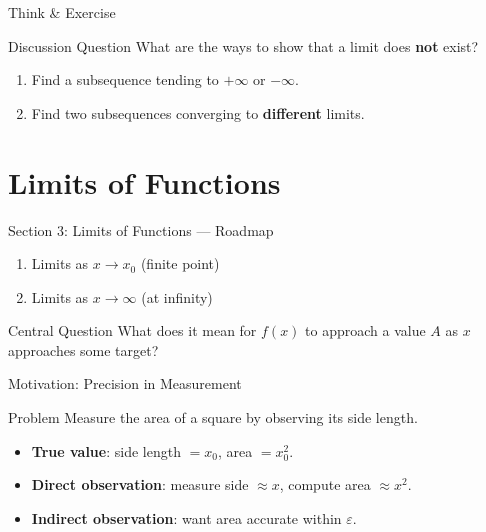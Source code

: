 \documentclass[aspectratio=169,10pt]{beamer}
\begin{document}
\begin{frame}{Think \& Exercise}
  \begin{block}{Discussion Question}
    What are the ways to show that a limit does \textbf{not} exist?
  \end{block}
  \pause
  \begin{enumerate}
    \item Find a subsequence tending to $+\infty$ or $-\infty$.
    \item Find two subsequences converging to \textbf{different} limits.
  \end{enumerate}
\end{frame}

\section{Limits of Functions}

\begin{frame}{Section 3: Limits of Functions --- Roadmap}
  \begin{enumerate}
    \item Limits as $x \to x_0$ (finite point)
    \item Limits as $x \to \infty$ (at infinity)
  \end{enumerate}
  \vfill
  \begin{block}{Central Question}
    What does it mean for $f(x)$ to approach a value $A$ as $x$ approaches some target?
  \end{block}
\end{frame}

\begin{frame}{Motivation: Precision in Measurement}
  \begin{exampleblock}{Problem}
    Measure the area of a square by observing its side length.
  \end{exampleblock}
  \pause
  \begin{itemize}
    \item<2-> \textbf{True value}: side length $= x_0$, area $= x_0^2$.
    \item<3-> \textbf{Direct observation}: measure side $\approx x$, compute area $\approx x^2$.
    \item<4-> \textbf{Indirect observation}: want area accurate within $\varepsilon$.
  \end{itemize}
  \vspace{0.5em}
\end{frame}
\end{document}
